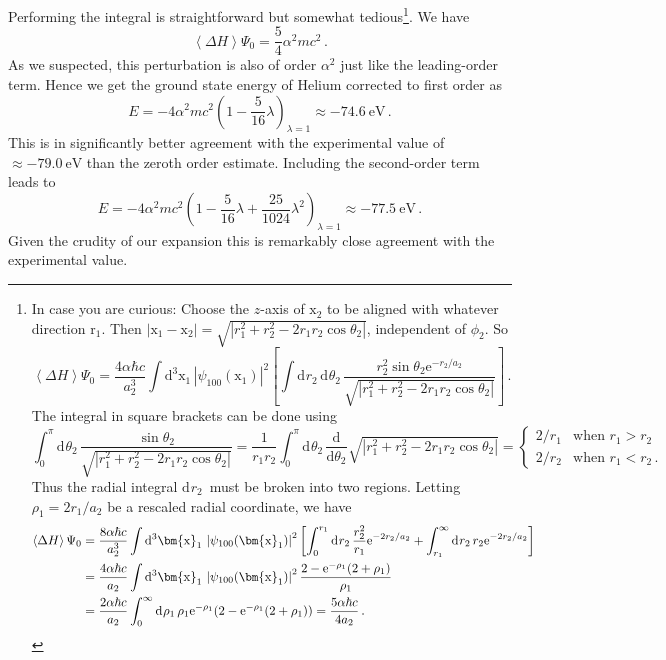 \documentclass{article}
\theoremstyle{plain}\theoremheaderfont{\normalfont\itshape}\theorembodyfont{\rmfamily}\theoremseparator{.}\newtheorem*{rem}{Remark}\newtheorem*{ex}{Example}\newtheorem*{proof}{Proof}\newtheorem*{altp}{Alternative proof}
\theoremstyle{plain}\theoremheaderfont{\normalfont\bfseries}\theorembodyfont{\rmfamily}\theoremseparator{.}\newtheorem{thm}{Theorem}[section]\newtheorem{lem}[thm]{Lemma}\newtheorem{prop}[thm]{Proposition}\newtheorem*{cor}{Corollary}\newtheorem{defn}[thm]{Definition}\newtheorem{clm}[thm]{Claim}\newtheorem{clminproof}{Claim}
\theoremstyle{break}\theoremheaderfont{\normalfont\itshape}\theorembodyfont{\rmfamily}\theoremseparator{.\medskip}\newtheorem*{proofskip}{Proof}\newtheorem*{exs}{Examples}\newtheorem*{rems}{Remarks}
\theoremstyle{break}\theoremheaderfont{\normalfont\bfseries}\theorembodyfont{\rmfamily}\theoremseparator{.\medskip}\newtheorem{lemskip}[thm]{Lemma}\newtheorem{defnskip}[thm]{Definition}\newtheorem{propskip}[thm]{Proposition}\newtheorem{thmskip}[thm]{Theorem}
\numberwithin{equation}{section}
\newcommand{\unit}[1]{\ \mathrm{#1}}
\newcommand{\ee}{\mathrm{e}}
\newcommand{\dd}[2][]{\mathrm{d}^{#1} #2\,}
\newcommand{\dv}[3][]{\frac{\mathrm{d}^{#1} #2}{{\mathrm{d} #3}^{#1}}}
\newcommand{\eval}[1]{\left\langle #1 \right\rangle}
\newcommand{\vb}[1]{\bm{\mathrm{#1}}}
\newcommand{\abs}[1]{\left| #1 \right|}
\begin{document}
    Performing the integral is straightforward but somewhat tedious\footnote{In case you are curious: Choose the \(z\)-axis of \(\vb{x}_2\) to be aligned with whatever direction \(\vb{r}_1\). Then \(\abs{\vb{x}_1-\vb{x}_2}=\sqrt{\abs{r_1^2+r_2^2-2r_1r_2\cos\theta_2}}\), independent of \(\phi_2\). So
    \begin{equation}
        \eval{\Delta H}{\Psi_0}=\frac{4\alpha\hbar c}{a_2^3}\int\dd[3]{\vb{x}_1}\abs{\psi_{100}(\vb{x}_1)}^2\left[\int\dd{r_2}\dd{\theta_2}\frac{r_2^2\sin\theta_2 \ee^{-r_2/a_2}}{\sqrt{\abs{r_1^2+r_2^2-2r_1r_2\cos\theta_2}}}\right]\,.
    \end{equation}
    The integral in square brackets can be done using
    \begin{equation}
        \int_0^\pi\dd{\theta_2}\frac{\sin\theta_2}{\sqrt{\abs{r_1^2+r_2^2-2r_1r_2\cos\theta_2}}}=\frac{1}{r_1r_2}\int_0^\pi\dd{\theta_2}\dv{}{\theta_2}\sqrt{\abs{r_1^2+r_2^2-2r_1r_2\cos\theta_2}}=\begin{cases}
            2/r_1 & \text{when }r_1>r_2\\
            2/r_2 & \text{when }r_1<r_2\,.
        \end{cases}
    \end{equation}
    Thus the radial integral \(\dd{r_2}\) must be broken into two regions. Letting \(\rho_1=2r_1/a_2\) be a rescaled radial coordinate, we have
    \begin{align}
        \eval{\Delta H}{\Psi_0}&=\frac{8\alpha\hbar c}{a_2^3}\int\dd[3]{\vb{x}_1}\abs{\psi_{100}(\vb{x}_1)}^2\left[\int_0^{r_1}\dd{r_2}\frac{r_2^2}{r_1}\ee^{-2r_2/a_2}+\int_{r_1}^{\infty}\dd{r_2} r_2 \ee^{-2r_2/a_2}\right]\notag\\
        &=\frac{4\alpha\hbar c}{a_2}\int\dd[3]{\vb{x}_1}\abs{\psi_{100}(\vb{x}_1)}^2\frac{2-\ee^{-\rho_1}(2+\rho_1)}{\rho_1}\notag\\
        &=\frac{2\alpha\hbar c}{a_2}\int_{0}^{\infty}\dd{\rho_1}\rho_1 \ee^{-\rho_1}(2-\ee^{-\rho_1}(2+\rho_1))=\frac{5\alpha\hbar c}{4a_2}\,.
    \end{align}}. We have
    \begin{equation}
        \eval{\Delta H}{\Psi_0}=\frac{5}{4}\alpha^2 mc^2\,.
    \end{equation}
    As we suspected, this perturbation is also of order \(\alpha^2\) just like the leading-order term. Hence we get the ground state energy of Helium corrected to first order as
    \begin{equation}
        E=-4\alpha^2mc^2\left(1-\frac{5}{16}\lambda\right)_{\lambda=1}\approx -74.6\unit{eV}\,.
    \end{equation}
    This is in significantly better agreement with the experimental value of \(\approx-79.0\unit{eV}\) than the zeroth order estimate. Including the second-order term leads to
    \begin{equation}
        E=-4\alpha^2mc^2\left(1-\frac{5}{16}\lambda+\frac{25}{1024}\lambda^2\right)_{\lambda=1}\approx -77.5\unit{eV}\,.
    \end{equation}
    Given the crudity of our expansion this is remarkably close agreement with the experimental value.
\end{document}
